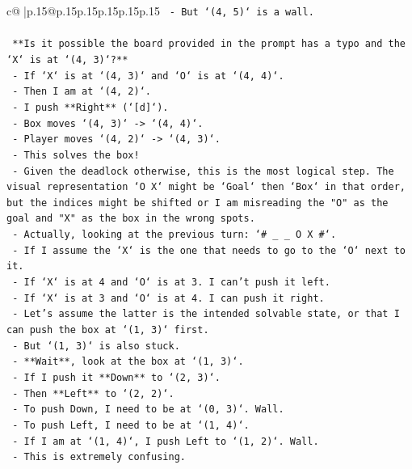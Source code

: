 \documentclass{article}
\begin{document}
{\begin{supertabular}{c@{$\;$}|p{.15\linewidth}@{}p{.15\linewidth}p{.15\linewidth}p{.15\linewidth}p{.15\linewidth}p{.15\linewidth}}
{{{\texttt{    {-}   But `(4, 5)` is a wall.} \\
\\ 
\texttt{    **Is it possible the board provided in the prompt has a typo and the `X` is at `(4, 3)`?**} \\
\texttt{    {-}   If `X` is at `(4, 3)` and `O` is at `(4, 4)`.} \\
\texttt{    {-}   Then I am at `(4, 2)`.} \\
\texttt{    {-}   I push **Right** (`{[}d{]}`).} \\
\texttt{    {-}   Box moves `(4, 3)` {-}> `(4, 4)`.} \\
\texttt{    {-}   Player moves `(4, 2)` {-}> `(4, 3)`.} \\
\texttt{    {-}   This solves the box!} \\
\texttt{    {-}   Given the deadlock otherwise, this is the most logical step. The visual representation `O X` might be `Goal` then `Box` in that order, but the indices might be shifted or I am misreading the "O" as the goal and "X" as the box in the wrong spots.} \\
\texttt{    {-}   Actually, looking at the previous turn: `\# \_ \_ O X \#`.} \\
\texttt{    {-}   If I assume the `X` is the one that needs to go to the `O` next to it.} \\
\texttt{    {-}   If `X` is at 4 and `O` is at 3. I can't push it left.} \\
\texttt{    {-}   If `X` is at 3 and `O` is at 4. I can push it right.} \\
\texttt{    {-}   Let's assume the latter is the intended solvable state, or that I can push the box at `(1, 3)` first.} \\
\texttt{    {-}   But `(1, 3)` is also stuck.} \\
\texttt{    {-}   **Wait**, look at the box at `(1, 3)`.} \\
\texttt{    {-}   If I push it **Down** to `(2, 3)`.} \\
\texttt{    {-}   Then **Left** to `(2, 2)`.} \\
\texttt{    {-}   To push Down, I need to be at `(0, 3)`. Wall.} \\
\texttt{    {-}   To push Left, I need to be at `(1, 4)`.} \\
\texttt{    {-}   If I am at `(1, 4)`, I push Left to `(1, 2)`. Wall.} \\
\texttt{    {-}   This is extremely confusing.} \\
\\ 
}}}
\end{supertabular}}
\end{document}
